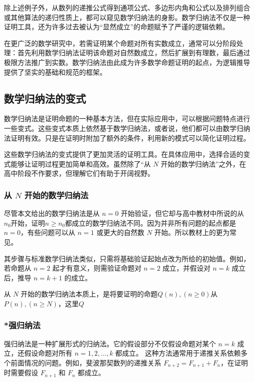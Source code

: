 除上述例子外，从数列的递推公式得到通项公式、多边形内角和公式以及排列组合或其他算法的递归性质上，都可以窥见数学归纳法的身影。数学归纳法不仅是一种证明工具，还为许多过去被认为“显然成立”的命题赋予了严谨的逻辑依赖。

在更广泛的数学研究中，若需证明某个命题对所有实数成立，通常可以分阶段处理：首先利用数学归纳法证明该命题对自然数成立，然后扩展到有理数，最后通过极限方法推广到实数。数学归纳法由此成为许多数学命题证明的起点，为逻辑推导提供了坚实的基础和规范的框架。

\subsection{数学归纳法的变式}

数学归纳法是证明命题的一种基本方法，但在实际应用中，可以根据问题特点进行一些变式。这些变式本质上依然基于数学归纳法，或者说，他们都可以由数学归纳法证明有效。只是在证明时附加了额外的条件，利用新的模式可以简化证明过程。

这些数学归纳法的变式提供了更加灵活的证明工具。在具体应用中，选择合适的变式能够让证明过程更加简单和高效。虽然除了“从 $N$ 开始的数学归纳法”之外，在高中阶段不作要求，但理解它们有助于开阔视野。

\subsubsection{从 $N$ 开始的数学归纳法}

尽管本文给出的数学归纳法是从 $n = 0$ 开始验证，但它却与高中教材中所说的从$n_0$开始，证明$n\geq n_0$都成立的数学归纳法不同。因为并非所有问题的起点都是 $n = 0$，有些问题可以从 $n = 1$ 或更大的自然数 $N$ 开始。所以教材上的更为常见。

其步骤与标准数学归纳法类似，只需将基础验证起始点改为所给的初始值。例如，
若命题从 $n = 2$ 起才有意义，则需验证命题对 $n = 2$ 成立，并假设对 $n = k$ 成立后，推导 $n = k+1$ 的成立。

从 $N$ 开始的数学归纳法本质上，是将要证明的命题$Q(n),(n\geq 0)$从$P(n),(n\geq N)$，这里$Q$

\subsubsection{*强归纳法}

强归纳法是一种扩展形式的归纳法。它的假设部分不仅假设命题对某个 $n = k$ 成立，还假设命题对所有 $n = 1, 2, \dots, k$ 都成立。  
这种方法通常用于递推关系依赖多个前面情况的问题。例如，斐波那契数列的递推关系 $F_{n+2} = F_{n+1} + F_n$，在证明时需要假设 $F_{n+1}$ 和 $F_n$ 都成立。

